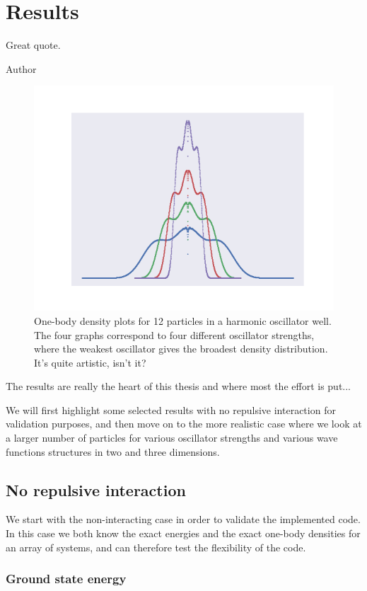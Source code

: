 \chapter{Results} \label{sec:results}
\epigraph{Great quote.}{Author}
\begin{figure}[H]
	\centering
	\includegraphics[scale=0.8]{Images/art.png}
	\caption{One-body density plots for 12 particles in a harmonic oscillator well. The four graphs correspond to four different oscillator strengths, where the weakest oscillator gives the broadest density distribution. It's quite artistic, isn't it?}
\end{figure}
The results are really the heart of this thesis and where most the effort is put... 

We will first highlight some selected results with no repulsive interaction for validation purposes, and then move on to the more realistic case where we look at a larger number of particles for various oscillator strengths and various wave functions structures in two and three dimensions.  

\newpage
\section{No repulsive interaction}
We start with the non-interacting case in order to validate the implemented code. In this case we both know the exact energies and the exact one-body densities for an array of systems, and can therefore test the flexibility of the code. 

\subsection{Ground state energy}

